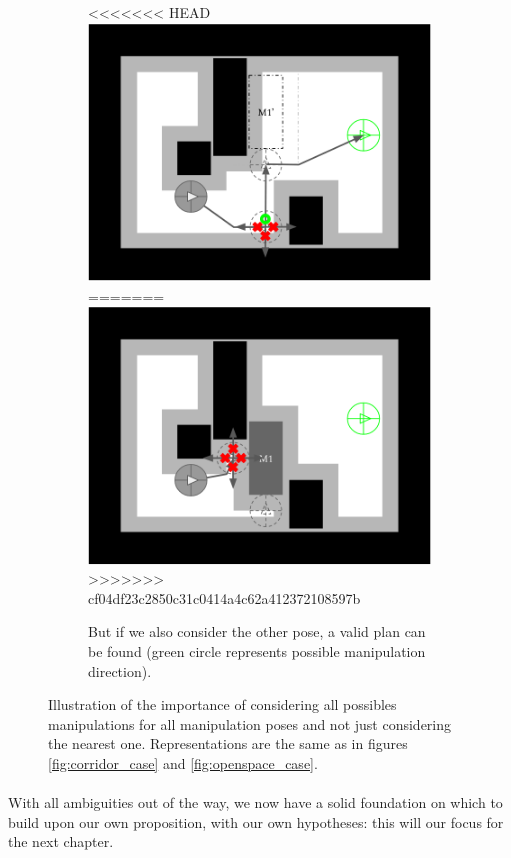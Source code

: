 \begin{figure}[H]
\begin{subfigure}{.35\textwidth}
  \centering
<<<<<<< HEAD
  \includegraphics[width=\linewidth]{Figures/Manipulation_Pose/manip_pose_4.png}
=======
  \includegraphics[width=\linewidth]{Figures/Manipulation_Pose/manip_pose_2.png}
>>>>>>> cf04df23c2850c31c0414a4c62a412372108597b
  \caption{But if we also consider the other pose, a valid plan can be found (green circle represents possible manipulation direction).}
  \label{fig:manip_pose_4}
\end{subfigure}
\caption{Illustration of the importance of considering all possibles manipulations for all manipulation poses and not just considering the nearest one. Representations are the same as in figures \ref{fig:corridor_case} and \ref{fig:openspace_case}.}
\label{fig:manipulation_poses}
\end{figure}

\paragraph{} With all ambiguities out of the way, we now have a solid foundation on which to build upon our own proposition, with our own hypotheses: this will our focus for the next chapter.
